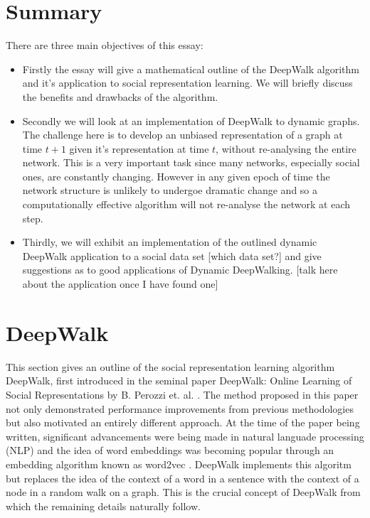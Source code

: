 \documentclass[a4paper]{article}
\begin{document}
\section{Summary}
There are three main objectives of this essay:
\begin{itemize}
\item Firstly the essay will give a mathematical outline of the DeepWalk
  algorithm and it's application to social representation learning. We will
  briefly discuss the benefits and drawbacks of the algorithm.
\item Secondly we will look at an implementation of DeepWalk to dynamic
  graphs. The challenge here is to develop an unbiased representation of a
  graph at time $t+1$ given it's representation at time $t$, without
  re-analysing the entire network. This is a very important task since many
  networks, especially social ones, are constantly changing. However in any given
  epoch of time the network structure is unlikely to undergoe dramatic change and
  so a computationally effective algorithm will not re-analyse the network at
  each step.
\item Thirdly, we will exhibit an implementation of the outlined dynamic DeepWalk
  application to a social data set [which data set?] and give suggestions as
  to good applications of Dynamic DeepWalking. [talk here about the
  application once I have found one]
\end{itemize}

\section{DeepWalk}
This section gives an outline of the social representation learning algorithm
DeepWalk, first introduced in the seminal paper DeepWalk: Online Learning of Social
Representations by B. Perozzi et. al. \cite{deepwalk}. The method proposed in
this paper not only demonstrated performance improvements from previous methodologies but
also motivated an entirely different approach. At the time of the paper being
written, significant advancements were being made in natural languade processing (NLP)
and the idea of word embeddings was becoming popular through an embedding
algorithm known as word2vec \cite{mikolov2013efficient,mikolov2013distributed}.
DeepWalk implements this algoritm but replaces the idea of the context of a word in
a sentence with the context of a node in a random walk on a graph. This is the
crucial concept of DeepWalk from which the remaining details naturally follow.
\end{document}
